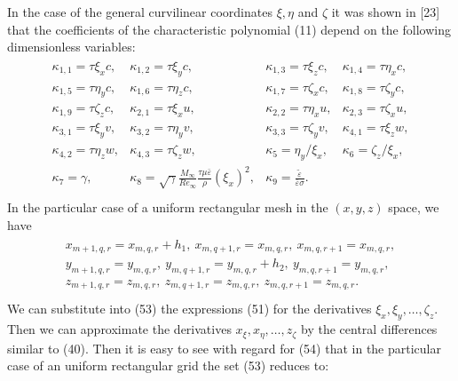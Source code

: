    In the case of the general curvilinear coordinates $\xi,\eta$ and $\zeta$
it was shown in [23] that the coefficients of the characteristic polynomial
(11) depend on the following dimensionless variables:
\begin{eqnarray}
\left. \begin{array}{llll}
\kappa_{1,1} = \tau \xi_x c,&\kappa_{1,2} = \tau \xi_y c,&\kappa_{1,3} =
\tau\xi_z c,&\kappa_{1,4} = \tau \eta_x c,\\
\kappa_{1,5} = \tau \eta_y c,&\kappa_{1,6} =\tau\eta_z c,&
\kappa_{1,7} = \tau \zeta_x c,&\kappa_{1,8} = \tau \zeta_y c,\\
\kappa_{1,9} =\tau\zeta_z c,&
\kappa_{2,1} = \tau \xi_x u,&\kappa_{2,2} = \tau \eta_x u,&\kappa_{2,3} =
\tau\zeta_x u,\\
\kappa_{3,1} = \tau \xi_y v,&\kappa_{3,2} = \tau \eta_y v,&\kappa_{3,3} =
\tau\zeta_y v,&\kappa_{4,1} = \tau \xi_z w,\\
\kappa_{4,2} = \tau \eta_z w,&\kappa_{4,3} =\tau\zeta_z w,&
\kappa_5=\eta_y/\xi_x,&\kappa_6 = \zeta_z/\xi_x,\\
\kappa_7=\gamma,&
\kappa_8=\sqrt{\gamma}\frac{M_{\infty}}{Re_{\infty}}\frac{\tau \mu \bar
{\varepsilon}}{\rho}(\xi_x)^2,&\kappa_9=\frac{\tilde{\varepsilon}}
{\bar{\varepsilon}\sigma}.&~~~~\\
\end{array} \right.
\end{eqnarray}
In the particular case of a uniform rectangular mesh in the $(x,y,z)$ space,
we have
\begin{eqnarray}
\left. \begin{array}{c}
x_{m+1,q,r}=x_{m,q,r} + h_1,~x_{m,q+1,r}=x_{m,q,r},~x_{m,q,r+1}=x_{m,q,r},\\
y_{m+1,q,r}=y_{m,q,r},~y_{m,q+1,r}=y_{m,q,r}+h_2,~y_{m,q,r+1}=y_{m,q,r},\\
z_{m+1,q,r}=z_{m,q,r},~z_{m,q+1,r}=z_{m,q,r},~z_{m,q,r+1}=z_{m,q,r}.\\
\end{array} \right.
\end{eqnarray}
We can substitute into (53) the expressions (51) for the derivatives $\xi_x,
\xi_y,\ldots,\zeta_z$. Then we can approximate the derivatives $x_\xi,x_\eta,
\ldots,z_\zeta$ by the central differences similar to (40). Then it is easy
to see with regard for (54) that in the particular case of an uniform
rectangular grid the set (53) reduces to:
